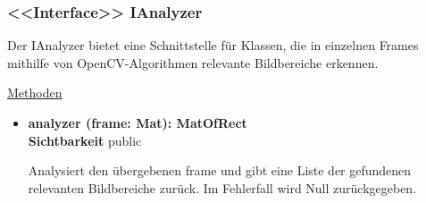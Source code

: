 \subsubsection{<<Interface>> IAnalyzer} \label{service:klasse:IAnalyzer}
Der IAnalyzer bietet eine Schnittstelle für Klassen, die in einzelnen Frames mithilfe von OpenCV-Algorithmen relevante Bildbereiche erkennen. \newline

\underline{Methoden}
\begin{itemize}
\itemsep0pt
\item \textbf{analyzer (frame: Mat): MatOfRect}\hfill\\
\textbf{Sichtbarkeit} public

Analysiert den übergebenen frame und gibt eine Liste der gefundenen relevanten Bildbereiche zurück. Im Fehlerfall wird Null zurückgegeben.

\end{itemize}